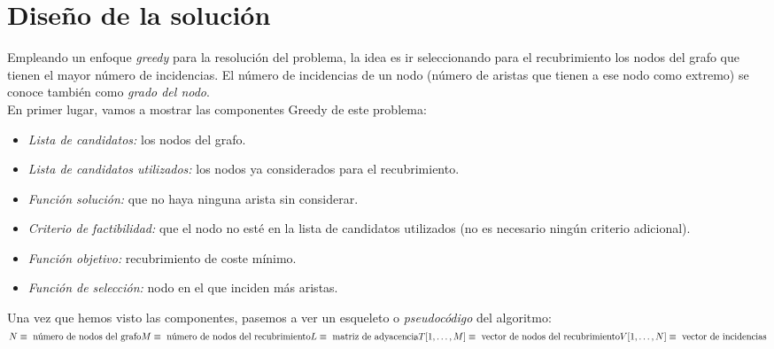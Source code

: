 \documentclass[11pt]{article}
\begin{document}
\section*{Diseño de la solución}

Empleando un enfoque \textit{greedy} para la resolución del problema, la idea es ir seleccionando para el recubrimiento los nodos del grafo que tienen el mayor número de incidencias. El número de incidencias de un nodo (número de aristas que tienen a ese nodo como extremo) se conoce también como \textit{grado del nodo}. \\

En primer lugar, vamos a mostrar las componentes Greedy de este problema:

\begin{itemize}
	\item \textit{Lista de candidatos:} los nodos del grafo.
	\item \textit{Lista de candidatos utilizados:} los nodos ya considerados para el recubrimiento.
	\item \textit{Función solución:} que no haya ninguna arista sin considerar.
	\item \textit{Criterio de factibilidad:} que el nodo no esté en la lista de candidatos utilizados (no es necesario ningún criterio adicional).
	\item \textit{Función objetivo:} recubrimiento de coste mínimo.
	\item \textit{Función de selección:} nodo en el que inciden más aristas.
\end{itemize}

Una vez que hemos visto las componentes, pasemos a ver un esqueleto o \textit{pseudocódigo} del algoritmo: \\

$N \equiv \text{ número de nodos del grafo}\\ M \equiv \text{ número de nodos del recubrimiento}\\ L \equiv \text{ matriz de adyacencia}\\ T[1,\dots,M] \equiv \text{ vector de nodos del recubrimiento}\\ V[1,\dots,N] \equiv \text{ vector de incidencias}$\\
\end{document}
